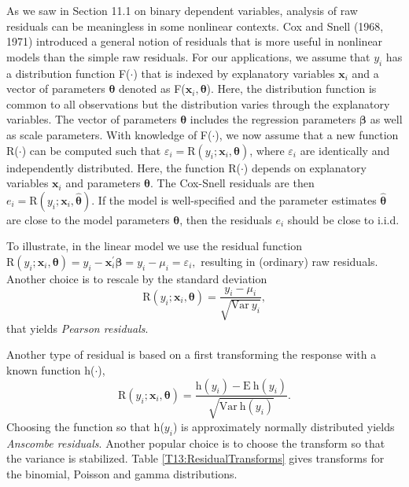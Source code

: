 As we saw in Section 11.1 on binary dependent variables, analysis of
raw residuals can be meaningless in some nonlinear contexts. Cox and
Snell (1968, 1971) introduced a general notion of residuals that is
more useful in nonlinear models than the simple raw residuals. For
our applications, we assume that $y_i$ has a distribution function
F($\cdot$) that is indexed by explanatory variables $\mathbf{x}_i$
and a vector of parameters $\boldsymbol \theta$ denoted as
F($\mathbf{x}_i,\boldsymbol \theta$). Here, the distribution
function is common to all observations but the distribution varies
through the explanatory variables. The vector of parameters
$\boldsymbol \theta$ includes the regression parameters $\boldsymbol
\beta$ as well as scale parameters. With knowledge of F($\cdot$), we
now assume that a new function R($\cdot$) can be computed such that
$\varepsilon_i = \mathrm{R}(y_i; \mathbf{x}_i,\boldsymbol \theta)$,
where $\varepsilon_i$ are identically and independently distributed.
Here, the function R($\cdot$) depends on explanatory variables
$\mathbf{x}_i$ and parameters $\boldsymbol \theta$. The Cox-Snell
residuals are then $e_i = \mathrm{R}(y_i;
\mathbf{x}_i,\widehat{\boldsymbol \theta})$. If the model is
well-specified and the parameter estimates $\widehat{\boldsymbol
\theta}$ are close to the model parameters $\boldsymbol \theta$,
then the residuals $e_i$ should be close to i.i.d.


To illustrate, in the linear model we use the residual function
$\mathrm{R}(y_i; \mathbf{x}_i,\boldsymbol \theta) = y_i -
\mathbf{x}_i^{\prime} \boldsymbol \beta =y_i - \mu_i =
\varepsilon_i,$ resulting in (ordinary) raw residuals. Another
choice is to rescale by the standard deviation
\begin{equation*}
\mathrm{R}(y_i; \mathbf{x}_i,\boldsymbol \theta) = \frac{y_i -
\mu_i}{\sqrt{\mathrm{Var~} y_i}} , \end{equation*} that yields
\emph{Pearson residuals}.

Another type of residual is based on a first transforming the
response with a known function h($\cdot$),
\begin{equation*}
\mathrm{R}(y_i; \mathbf{x}_i,\boldsymbol \theta) =
\frac{\mathrm{h}(y_i) - \mathrm{E~}
\mathrm{h}(y_i)}{\sqrt{\mathrm{Var~}\mathrm{h}(y_i)}} .
\end{equation*}
Choosing the function so that h($y_i$) is approximately normally
distributed yields \emph{Anscombe residuals}. Another popular choice
is to choose the transform so that the variance is stabilized. Table
\ref{T13:ResidualTransforms} gives transforms for the binomial,
Poisson and gamma distributions.

